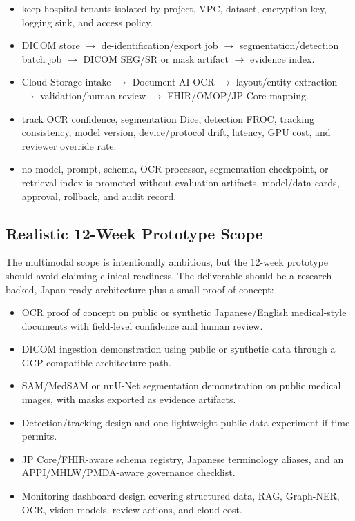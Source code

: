 \begin{itemize}
  \item {} keep hospital tenants isolated by project, VPC, dataset, encryption key, logging sink, and access policy.
  \item {} DICOM store $\rightarrow$ de-identification/export job $\rightarrow$ segmentation/detection batch job $\rightarrow$ DICOM SEG/SR or mask artifact $\rightarrow$ evidence index.
  \item {} Cloud Storage intake $\rightarrow$ Document AI OCR $\rightarrow$ layout/entity extraction $\rightarrow$ validation/human review $\rightarrow$ FHIR/OMOP/JP Core mapping.
  \item {} track OCR confidence, segmentation Dice, detection FROC, tracking consistency, model version, device/protocol drift, latency, GPU cost, and reviewer override rate.
  \item {} no model, prompt, schema, OCR processor, segmentation checkpoint, or retrieval index is promoted without evaluation artifacts, model/data cards, approval, rollback, and audit record.
\end{itemize}

\subsection{Realistic 12-Week Prototype Scope}

The multimodal scope is intentionally ambitious, but the 12-week prototype should avoid claiming clinical readiness. The deliverable should be a research-backed, Japan-ready architecture plus a small proof of concept:

\begin{itemize}
  \item OCR proof of concept on public or synthetic Japanese/English medical-style documents with field-level confidence and human review.
  \item DICOM ingestion demonstration using public or synthetic data through a GCP-compatible architecture path.
  \item SAM/MedSAM or nnU-Net segmentation demonstration on public medical images, with masks exported as evidence artifacts.
  \item Detection/tracking design and one lightweight public-data experiment if time permits.
  \item JP Core/FHIR-aware schema registry, Japanese terminology aliases, and an APPI/MHLW/PMDA-aware governance checklist.
  \item Monitoring dashboard design covering structured data, RAG, Graph-NER, OCR, vision models, review actions, and cloud cost.
\end{itemize}
